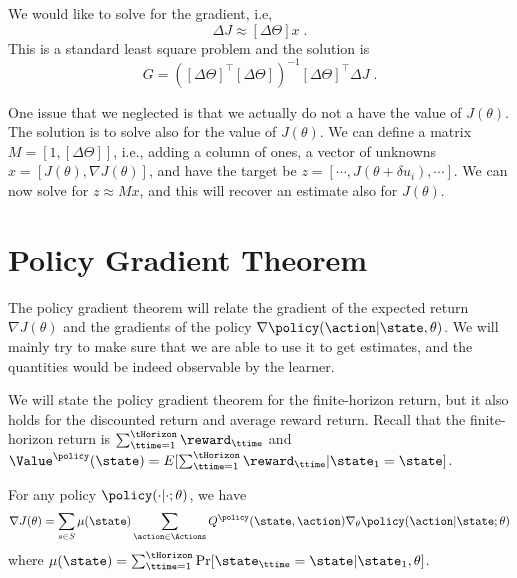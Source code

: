 We would like to solve for the gradient, i.e,
\[
\Delta J\approx [\Delta \Theta]x\;.
\]
This is a standard least square problem and the solution is
\[
G=([\Delta \Theta]^\top [\Delta \Theta])^{-1} [\Delta\Theta]^\top
\Delta J\;.
\]

One issue that we neglected is that we actually do not a have the
value of $J(\theta)$. The solution is to solve also for the value of
$J(\theta)$.
%
We can define a matrix $M=[1, [\Delta\Theta]]$, i.e., adding a column of ones, a vector of unknowns $x=[J(\theta), \nabla J(\theta)]$, and have the target be $z=[\cdots, J(\theta+\delta u_i),\cdots]$. We can now solve for $z\approx Mx$, and this will recover an estimate also for $J(\theta)$.


\section{Policy Gradient Theorem}

The policy gradient theorem will relate the gradient of the expected
return $\nabla J(\theta)$ and the gradients of the policy $\nabla
\policy(\action|\state,\theta)$. We will mainly try to make sure
that we are able to use it to get estimates, and the quantities
would be indeed observable by the learner.

We will state the policy gradient theorem for the finite-horizon
return, but it also holds for the discounted return and average
reward return. Recall that the finite-horizon return is
$\sum_{\ttime=1}^\tHorizon \reward_\ttime$ and
$\Value^\policy(\state)=E[\sum_{\ttime=1}^\tHorizon
\reward_\ttime|\state_1=\state]$.

\begin{theorem}
\label{thm:policy-gradient} For any policy
$\policy(\cdot|\cdot;\theta)$, we have
\[
\nabla J(\theta)= \sum_{s\in S} \mu(\state) \sum_{\action\in
\Actions} Q^\policy (\state,\action)\nabla_\theta
\policy(\action|\state;\theta)
\]
where $\mu(\state)=\sum_{\ttime=1}^\tHorizon\Pr[\state_\ttime=\state|\state_1,\theta]$.
\end{theorem}

